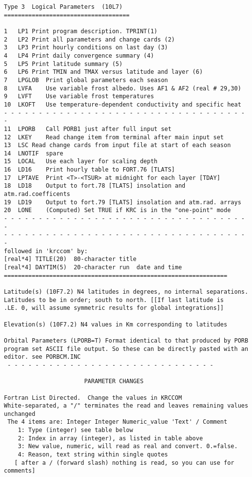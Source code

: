 \begin{verbatim}
Type 3	Logical Parameters	(10L7) ====================================

1	LP1	Print program description. TPRINT(1) 
2	LP2	Print all parameters and change cards (2)
3	LP3	Print hourly conditions on last day (3)
4	LP4	Print daily convergence summary (4)
5	LP5	Print latitude summary (5)
6	LP6	Print TMIN and TMAX versus latitude and layer (6)
7	LPGLOB	Print global parameters each season
8	LVFA	Use variable frost albedo. Uses AF1 & AF2 (real # 29,30)
9	LVFT	Use variable frost temperatures
10	LKOFT   Use temperature-dependent conductivity and specific heat
- - - - - - - - - - - - - - - - - - - - - - - - - - - - - - - - - - - - 
11	LPORB	Call PORB1 just after full input set
12	LKEY	Read change item from terminal after main input set
13	LSC	Read change cards from input file at start of each season
14	LNOTIF	spare
15	LOCAL	Use each layer for scaling depth
16	LD16	Print hourly table to FORT.76 [TLATS] 
17	LPTAVE	Print <T>-<TSUR> at midnight for each layer [TDAY]
18	LD18	Output to fort.78 [TLATS] insolation and atm.rad.coefficents
19	LD19	Output to fort.79 [TLATS] insolation and atm.rad. arrays 
20	LONE	(Computed) Set TRUE if KRC is in the "one-point" mode
- - - - - - - - - - - - - - - - - - - - - - - - - - - - - - - - - - - - 
- - - - - - - - - - - - - - - - - - - - - - - - - - - - - - - - - - - - 
followed in 'krccom' by: 
[real*4] TITLE(20)	80-character title
[real*4] DAYTIM(5)	20-character run  date and time
================================================================

Latitude(s) (10F7.2) N4 latitudes in degrees, no internal separations.
Latitudes to be in order; south to north. [[If last latitude is
.LE. 0, will assume symmetric results for global integrations]]

Elevation(s) (10F7.2) N4 values in Km corresponding to latitudes

Orbital Parameters (LPORB=T) Format identical to that produced by PORB
program set ASCII file output. So these can be directly pasted with an
editor. see PORBCM.INC
 - - - - - - - - - - - - - - - - - - - - - - - - - - - - - - 

                       PARAMETER CHANGES 

Fortran List Directed.  Change the values in KRCCOM	
White-separated, a "/" terminates the read and leaves remaining values unchanged
 The 4 items are: Integer Integer Numeric_value 'Text' / Comment
    1: Type (integer) see table below
    2: Index in array (integer), as listed in table above
    3: New value, numeric, will read as real and convert. 0.=false.
    4: Reason, text string within single quotes
   [ after a / (forward slash) nothing is read, so you can use for comments]


\end{verbatim}

